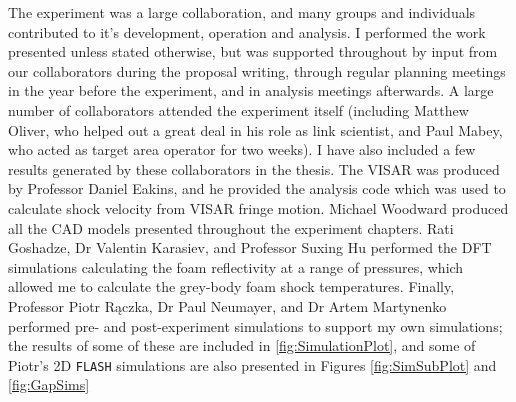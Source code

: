 The experiment was a large collaboration, and many groups and individuals contributed to it's development, operation and analysis. I performed the work presented unless stated otherwise, but was supported throughout by input from our collaborators during the proposal writing, through regular planning meetings in the year before the experiment, and in analysis meetings afterwards. A large number of collaborators attended the experiment itself (including Matthew Oliver, who helped out a great deal in his role as link scientist, and Paul Mabey, who acted as target area operator for two weeks). I have also included a few results generated by these collaborators in the thesis. The VISAR was produced by Professor Daniel Eakins, and he provided the analysis code which was used to calculate shock velocity from VISAR fringe motion. Michael Woodward produced all the CAD models presented throughout the experiment chapters. Rati Goshadze, Dr Valentin  Karasiev, and Professor Suxing Hu performed the DFT simulations calculating the foam reflectivity at a range of pressures, which allowed me to calculate the grey-body foam shock temperatures. Finally, Professor Piotr R\k{a}czka, Dr Paul Neumayer, and Dr Artem Martynenko performed pre- and post-experiment simulations to support my own simulations; the results of some of these are included in \ref{fig:SimulationPlot}, and some of Piotr's 2D \texttt{FLASH} simulations are also presented in Figures \ref{fig:SimSubPlot} and \ref{fig:GapSims}


